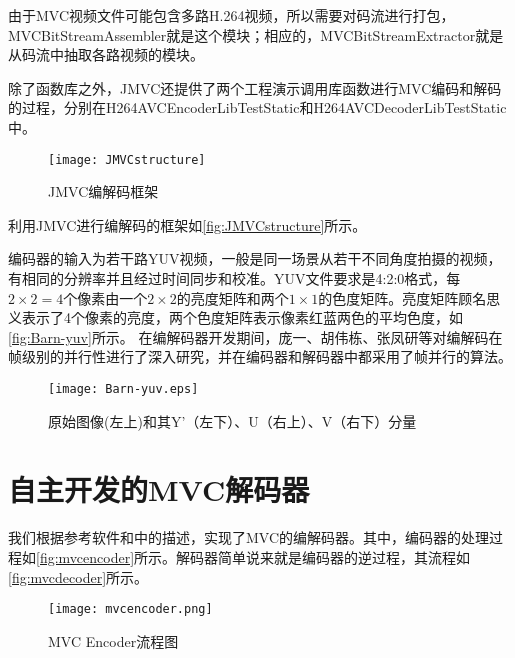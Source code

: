 由于MVC视频文件可能包含多路H.264视频，所以需要对码流进行打包，MVCBitStreamAssembler就是这个模块；相应的，MVCBitStreamExtractor就是从码流中抽取各路视频的模块。

除了函数库之外，JMVC还提供了两个工程演示调用库函数进行MVC编码和解码的过程，分别在H264AVCEncoderLibTestStatic和H264AVCDecoderLibTestStatic中。

\begin{figure}[htbp]
\begin{center}
\texttt{[image: JMVCstructure]}
\caption{JMVC编解码框架}
\label{fig:JMVCstructure}
\end{center}
\end{figure}

利用JMVC进行编解码的框架如\autoref{fig:JMVCstructure}所示。

编码器的输入为若干路YUV视频，一般是同一场景从若干不同角度拍摄的视频，有相同的分辨率并且经过时间同步和校准。YUV文件要求是4:2:0格式，每$2\times2=4$个像素由一个$2\times2$的亮度矩阵和两个$1\times1$的色度矩阵。亮度矩阵顾名思义表示了4个像素的亮度，两个色度矩阵表示像素红蓝两色的平均色度，如\autoref{fig:Barn-yuv}所示。
在编解码器开发期间，庞一、胡伟栋、张凤研等对编解码在帧级别的并行性进行了深入研究\cite{pang2009adaptive,yi2008parallelized}，并在编码器和解码器中都采用了帧并行的算法。

\begin{figure}[htbp]
\begin{center}
\texttt{[image: Barn-yuv.eps]}
\caption{原始图像(左上)和其Y'（左下）、U（右上）、V（右下）分量}
\label{fig:Barn-yuv}
\end{center}
\end{figure}

\section{自主开发的MVC解码器}
\label{sec:mvcdecoder}

我们根据参考软件和中的描述，实现了MVC的编解码器。其中，编码器的处理过程如\autoref{fig:mvcencoder}所示。解码器简单说来就是编码器的逆过程，其流程如\autoref{fig:mvcdecoder}所示。

\begin{figure}[htbp]
\begin{center}
\texttt{[image: mvcencoder.png]}
\caption{MVC Encoder流程图}
\label{fig:mvcencoder}
\end{center}
\end{figure}

